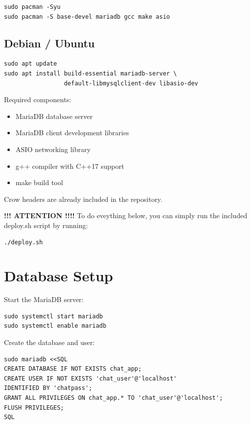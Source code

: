 \documentclass[11pt]{article}
\begin{document}
\begin{verbatim}
sudo pacman -Syu
sudo pacman -S base-devel mariadb gcc make asio
\end{verbatim}

\subsection*{Debian / Ubuntu}

\begin{verbatim}
sudo apt update
sudo apt install build-essential mariadb-server \
                 default-libmysqlclient-dev libasio-dev
\end{verbatim}

Required components:

\begin{itemize}
\item MariaDB database server
\item MariaDB client development libraries
\item ASIO networking library
\item g++ compiler with C++17 support
\item make build tool
\end{itemize}

Crow headers are already included in the repository.


\textbf{!!! ATTENTION !!!!}
To do eveything below, you can simply run the included deploy.sh script
by running:

\begin{verbatim}
./deploy.sh
\end{verbatim}



\section*{Database Setup}
Start the MariaDB server:

\begin{verbatim}
sudo systemctl start mariadb
sudo systemctl enable mariadb
\end{verbatim}

Create the database and user:

\begin{verbatim}
sudo mariadb <<SQL
CREATE DATABASE IF NOT EXISTS chat_app;
CREATE USER IF NOT EXISTS 'chat_user'@'localhost'
IDENTIFIED BY 'chatpass';
GRANT ALL PRIVILEGES ON chat_app.* TO 'chat_user'@'localhost';
FLUSH PRIVILEGES;
SQL
\end{verbatim}
\end{document}
